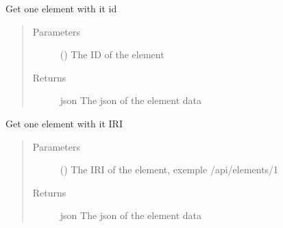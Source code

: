 \documentclass[letterpaper,10pt,english]{sphinxmanual}
\begin{document}
\begin{fulllineitems}
\begin{fulllineitems}
\label{\detokenize{index:Api.Api.get_element_by_id}}
\sphinxAtStartPar
Get one element with it id
\begin{quote}\begin{description}
\item[{Parameters}] \leavevmode
\sphinxAtStartPar
{} () \textendash{} The ID of the element

\item[{Returns}] \leavevmode
\sphinxAtStartPar
json \textendash{} The json of the element data

\end{description}\end{quote}

\end{fulllineitems}


\begin{fulllineitems}
\label{\detokenize{index:Api.Api.get_element_by_iri}}
\sphinxAtStartPar
Get one element with it IRI
\begin{quote}\begin{description}
\item[{Parameters}] \leavevmode
\sphinxAtStartPar
{} () \textendash{} The IRI of the element, exemple /api/elements/1

\item[{Returns}] \leavevmode
\sphinxAtStartPar
json \textendash{} The json of the element data

\end{description}\end{quote}

\end{fulllineitems}



\end{fulllineitems}
\end{document}
